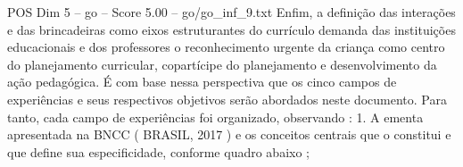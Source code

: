 \begin{textsample}{POS Dim 5 – go – Score 5.00 – go/go\_inf\_9.txt}
Enfim, a definição das interações e das brincadeiras como eixos estruturantes do currículo demanda das instituições educacionais e dos professores o reconhecimento urgente da criança como centro do planejamento curricular, copartícipe do planejamento e desenvolvimento da ação pedagógica.
É com base nessa perspectiva que os cinco campos de experiências e seus respectivos objetivos serão abordados neste documento.
Para tanto, cada campo de experiências foi organizado, observando : 1.
A ementa apresentada na BNCC ( BRASIL, 2017 ) e os conceitos centrais que o constitui e que define sua especificidade, conforme quadro abaixo ;

\end{textsample}
